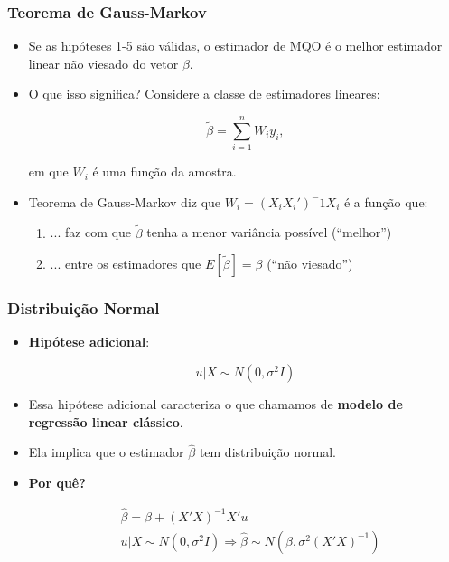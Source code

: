 \documentclass[10pt,slides,xcolor=pdftex,dvipsnames,table]{beamer}
\begin{document}
\begin{frame}[fragile]
	\frametitle{Teorema de Gauss-Markov}

\begin{itemize}\itemsep1.2em

\item Se as hipóteses 1-5 são válidas, o estimador de MQO é o melhor estimador linear não viesado do vetor $\beta$.

\item O que isso significa? Considere a classe de estimadores lineares:

$$ \widetilde{\beta} = \sum_{i=1}^n W_i y_i, $$

em que $W_i$ é uma função da amostra.

\item Teorema de Gauss-Markov diz que $W_i = (X_i X_i')^-1 X_i$ é a função que:
\begin{enumerate}
\item ... faz com que $\widetilde{\beta}$ tenha a menor variância possível (``melhor'')
\item ... entre os estimadores  que $E[\widetilde{\beta}] = \beta$ (``não viesado'')   
\end{enumerate}      

\end{itemize}

\end{frame}


\begin{frame}[fragile]
	\frametitle{Distribuição Normal}

\begin{itemize}\itemsep1.2em

\item \textbf{Hipótese adicional}:

$$u | X \sim N(0, \sigma^2 I)$$     

\item Essa hipótese adicional caracteriza o que chamamos de \textbf{modelo de regressão linear clássico}.

\item Ela implica que o estimador $\widehat{\beta}$ tem distribuição normal.

\item \textbf{Por quê?} 

\begin{align*}
& \widehat{\beta} = \beta + (X'X)^{-1} X'u \\
& u | X \sim N(0, \sigma^2 I) \Longrightarrow \widehat{\beta} \sim N(\beta, \sigma^2 (X'X)^{-1})
\end{align*}

\end{itemize}

\end{frame}
\end{document}
